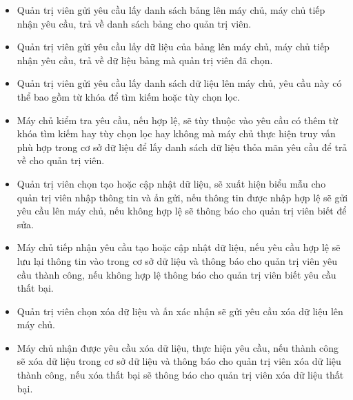 \documentclass[./../main.tex]{subfiles}
\begin{document}
\begin{itemize}
    \item Quản trị viên gửi yêu cầu lấy danh sách bảng lên máy chủ, máy chủ tiếp nhận yêu cầu, trả về danh sách bảng cho quản trị viên.
    \item Quản trị viên gửi yêu cầu lấy dữ liệu của bảng lên máy chủ, máy chủ tiếp nhận yêu cầu, trả về dữ liệu bảng mà quản trị viên đã chọn.
    \item Quản trị viên gửi yêu cầu lấy danh sách dữ liệu lên máy chủ, yêu cầu này có thể bao gồm từ khóa để tìm kiếm hoặc tùy chọn lọc.
    \item Máy chủ kiểm tra yêu cầu, nếu hợp lệ, sẽ tùy thuộc vào yêu cầu có thêm từ khóa tìm kiếm hay tùy chọn lọc hay không mà máy chủ thực hiện truy vấn phù hợp trong cơ sở dữ liệu để lấy danh sách dữ liệu thỏa mãn yêu cầu để trả về cho quản trị viên.
    \item Quản trị viên chọn tạo hoặc cập nhật dữ liệu, sẽ xuất hiện biểu mẫu cho quản trị viên nhập thông tin và ấn gửi, nếu thông tin được nhập hợp lệ sẽ gửi yêu cầu lên máy chủ, nếu không hợp lệ sẽ thông báo cho quản trị viên biết để sửa.
    \item Máy chủ tiếp nhận yêu cầu tạo hoặc cập nhật dữ liệu, nếu yêu cầu hợp lệ sẽ lưu lại thông tin vào trong cơ sở dữ liệu và thông báo cho quản trị viên yêu cầu thành công, nếu không hợp lệ thông báo cho quản trị viên biết yêu cầu thất bại.
    \item Quản trị viên chọn xóa dữ liệu và ấn xác nhận sẽ gửi yêu cầu xóa dữ liệu lên máy chủ.
    \item Máy chủ nhận được yêu cầu xóa dữ liệu, thực hiện yêu cầu, nếu thành công sẽ xóa dữ liệu trong cơ sở dữ liệu và thông báo cho quản trị viên xóa dữ liệu thành công, nếu xóa thất bại sẽ thông báo cho quản trị viên xóa dữ liệu thất bại.
\end{itemize}
\end{document}
